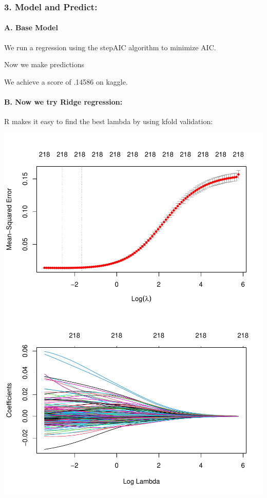 \documentclass[
]{article}
\begin{document}
\hypertarget{model-and-predict}{%
\subsubsection{3. Model and Predict:}\label{model-and-predict}}

\hypertarget{a.-base-model}{%
\paragraph{A. Base Model}\label{a.-base-model}}

We run a regression using the stepAIC algorithm to minimize AIC.

Now we make predictions

We achieve a score of .14586 on kaggle.

\hypertarget{b.-now-we-try-ridge-regression}{%
\paragraph{B. Now we try Ridge
regression:}\label{b.-now-we-try-ridge-regression}}

R makes it easy to find the best lambda by using kfold validation:

\includegraphics{Eric_Hirsch_621_Final_HomePrices_files/figure-latex/unnamed-chunk-16-1.pdf}
\includegraphics{Eric_Hirsch_621_Final_HomePrices_files/figure-latex/unnamed-chunk-16-2.pdf}
\end{document}
